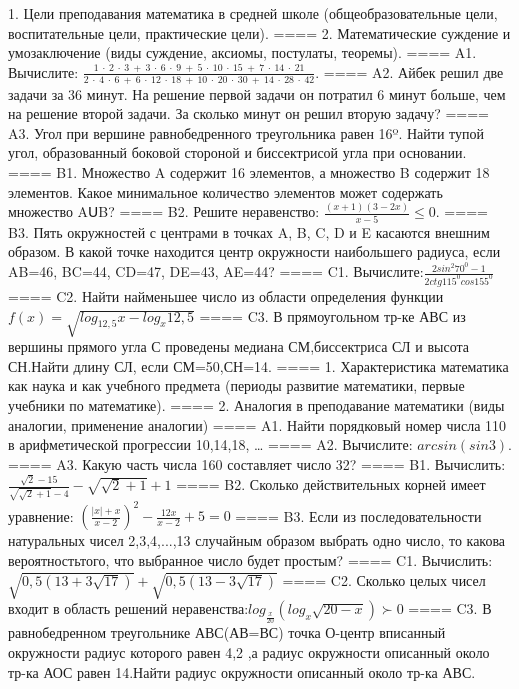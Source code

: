 1. Цели преподавания математика в средней школе (общеобразовательные цели, воспитательные цели, практические цели).
====
2. Математические суждение и умозаключение (виды суждение, аксиомы, постулаты, теоремы).
====
A1. Вычислите: \(\frac{1\  \cdot \ 2\  \cdot \ 3\  + \ 3\  \cdot \ 6\  \cdot \ 9\  + \ 5\  \cdot \ 10\  \cdot \ 15\  + \ 7\  \cdot \ 14\  \cdot \ 21}{2\  \cdot \ 4\  \cdot \ 6\  + \ 6\  \cdot \ 12\  \cdot \ 18\  + \ 10\  \cdot \ 20\  \cdot \ 30\  + \ 14\  \cdot \ 28\  \cdot \ 42}\).
====
A2. Айбек решил две задачи за 36 минут. На решение первой задачи он потратил 6 минут больше, чем на решение второй задачи. За сколько минут он решил вторую задачу?
====
A3. Угол при вершине равнобедренного треугольника равен 16º. Найти тупой угол, образованный боковой стороной и биссектрисой угла при основании.
====
B1. Множество A содержит 16 элементов, а множество B содержит 18 элементов. Какое минимальное количество элементов может содержать множество AՍB?
====
B2. Решите неравенство: \(\frac{(x + 1)(3 - 2x)}{x - 5} \leq 0\).
====
B3. Пять окружностей с центрами в точках A, B, C, D и E касаются внешним образом. В какой точке находится центр окружности наибольшего радиуса, если AB=46, BC=44, CD=47, DE=43, AE=44?
====
C1. Вычислите:\(\frac{2sin^{2}70^{0} - 1}{2ctg115^{0}cos155^{0}}\)
====
C2. Найти найменьшее число из области определения функции \(f(x) = \sqrt{log_{12,5}x - log_{x}12,5}\)
====
C3. В прямоугольном тр-ке АВС из вершины прямого угла С проведены медиана СМ,биссектриса СЛ и высота СН.Найти длину СЛ, если СМ=50,СН=14.
====
1. Характеристика математика как наука и как учебного предмета (периоды развитие математики, первые учебники по математике).
====
2. Аналогия в преподавание математики (виды аналогии, применение аналогии)
====
A1. Найти порядковый номер числа 110 в арифметической прогрессии 10,14,18, \ldots{}
====
A2. Вычислите: \(arcsin(sin3)\).
====
A3. Какую часть числа 160 составляет число 32?
====
B1. Вычислить: \(\frac{\sqrt{2} - 15}{\sqrt{\sqrt{2} + 1} - 4} - \sqrt{\sqrt{2} + 1} + 1\)
====
B2. Сколько действительных корней имеет уравнение: \({(\frac{|x| + x}{x - 2})}^{2} - \frac{12x}{x - 2} + 5 = 0\)
====
B3. Если из последовательности натуральных чисел 2,3,4,...,13 случайным образом выбрать одно число, то какова вероятностьтого, что выбранное число будет простым?
====
C1. Вычислить:\(\sqrt{0,5(13 + 3\sqrt{17})} + \sqrt{0,5(13 - 3\sqrt{17})}\)
====
C2. Сколько целых чисел входит в область решений неравенства:\(log_{\frac{x}{20}}(log_{x}\sqrt{20 - x}) \succ 0\)
====
C3. В равнобедренном треугольнике АВС(АВ=ВС) точка О-центр вписанный окружности радиус которого равен 4,2 ,а радиус окружности описанный около тр-ка АОС равен 14.Найти радиус окружности описанный около тр-ка АВС.
